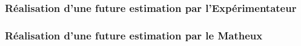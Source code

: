\documentclass[11pt]{beamer}
\begin{document}
\begin{frame}
\frametitle<1-3>{Réalisation d'une future estimation par l'\textbf{Expérimentateur}}
\frametitle<4-6>{Réalisation d'une future estimation par le \textbf{Matheux}}

\begin{columns}
\begin{column}{5cm}
\begin{center}
\end{center}
\end{column}
\end{columns}
\end{frame}
\end{document}
